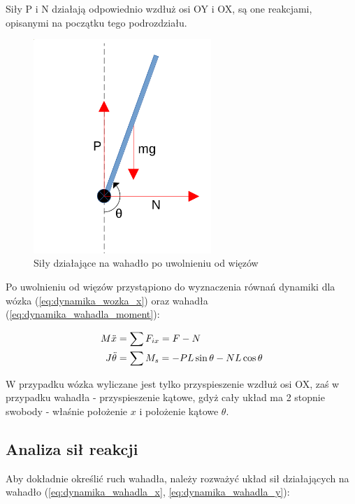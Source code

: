 \documentclass[12pt]{article}
\numberwithin{equation}{section}
\begin{document}
Siły P i N działają odpowiednio wzdłuż osi OY i OX, są one reakcjami, opisanymi na początku tego podrozdziału.

\begin{figure}[H]
    \centering
    \includegraphics[width=0.6\textwidth]{wiezy_wahadlo.png}
    \caption{Siły działające na wahadło po uwolnieniu od więzów}
    \label{fig:wiezy_wahadlo}
\end{figure}

Po uwolnieniu od więzów przystąpiono do wyznaczenia równań dynamiki dla wózka (\ref{eq:dynamika_wozka_x}) oraz wahadła (\ref{eq:dynamika_wahadla_moment}):

\begin{align}
    M\Ddot{x} &= \sum{F_{ix}} = F - N \label{eq:dynamika_wozka_x}\\
    J\Ddot{\theta} &= \sum{M_{s}} = -PL\sin{\theta} - NL\cos{\theta} \label{eq:dynamika_wahadla_moment}
\end{align}

W przypadku wózka wyliczane jest tylko przyspieszenie wzdłuż osi OX, zaś w przypadku wahadła - przyspieszenie kątowe, gdyż cały układ ma 2 stopnie swobody - właśnie położenie $x$ i położenie kątowe $\theta$.

\subsection{Analiza sił reakcji}

Aby dokładnie określić ruch wahadła, należy rozważyć układ sił działających na wahadło (\ref{eq:dynamika_wahadla_x}, \ref{eq:dynamika_wahadla_y}):
\end{document}
